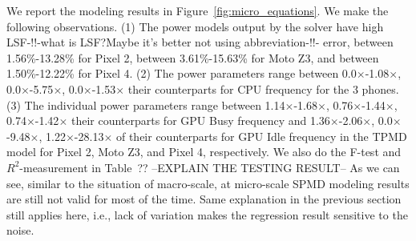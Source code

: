 
{\color{blue}We report the modeling results in Figure~\ref{fig:micro_equations}.} We make the following observations.
(1) The power models output by the solver have high LSF{\color{blue}-!!-what is LSF?Maybe it's better not using abbreviation-!!-} error,
between 1.56\%-13.28\% for Pixel 2,
between 3.61\%-15.63\% for Moto Z3,
and between 1.50\%-12.22\% for Pixel 4.
(2) The power parameters range between
0.0$\times$-1.08$\times$,
0.0$\times$-5.75$\times$,
0.0$\times$-1.53$\times$ their
counterparts for CPU frequency for the 3 phones.
(3) The individual power parameters range between
1.14$\times$-1.68$\times$,
0.76$\times$-1.44$\times$,
0.74$\times$-1.42$\times$ their
counterparts for GPU Busy frequency and
1.36$\times$-2.06$\times$,
0.0$\times$-9.48$\times$,
1.22$\times$-28.13$\times$ of their
counterparts for GPU Idle frequency 
in the TPMD model for Pixel
2, Moto Z3, and Pixel 4, respectively. {\color{blue}We also do the F-test and $R^2$-measurement in Table~?? --EXPLAIN THE TESTING RESULT-- 
As we can see, similar to the situation of macro-scale, at micro-scale SPMD modeling results are still not valid for most of the time. Same explanation in the previous section still applies here, i.e., lack of variation makes the regression result sensitive to the noise.}



